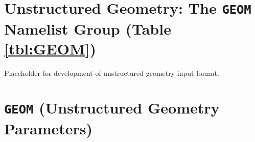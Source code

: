 \documentclass[12pt]{article}
\begin{document}
\vspace{1.0in}
\section{Unstructured Geometry: The \texorpdfstring{{\tt GEOM}}{GEOM} Namelist Group (Table \ref{tbl:GEOM})}
\label{info:GEOM}

Placeholder for development of unstructured geometry input format.

\vspace{\baselineskip}




\section{\texorpdfstring{{\tt GEOM}}{GEOM} (Unstructured Geometry Parameters)}
\end{document}
